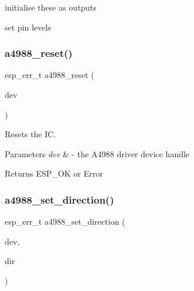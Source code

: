 initialise these as outputs

set pin levels \mbox{\label{group__A4988__Driver__functions_ga8841dcdeca8a2b9ae13f3e8e1a63884c}} 
\subsubsection{\texorpdfstring{a4988\+\_\+reset()}{a4988\_reset()}}
{\footnotesize\ttfamily esp\+\_\+err\+\_\+t a4988\+\_\+reset (\begin{DoxyParamCaption}\item[{\hyperlink{group__A4988__definitions_ga16590a9dd79ad8fcf4c317be2659b6c5}{A4988\+\_\+\+D\+EV}}]{dev }\end{DoxyParamCaption})}



Resets the IC. 


\begin{DoxyParams}{Parameters}
{\em dev} & -\/ the A4988 driver device handle \\
\hline
\end{DoxyParams}
\begin{DoxyReturn}{Returns}
E\+S\+P\+\_\+\+OK or Error 
\end{DoxyReturn}
\mbox{\label{group__A4988__Driver__functions_ga3762fb75b81dc81b9348a2c29d0de3bc}} 
\subsubsection{\texorpdfstring{a4988\+\_\+set\+\_\+direction()}{a4988\_set\_direction()}}
{\footnotesize\ttfamily esp\+\_\+err\+\_\+t a4988\+\_\+set\+\_\+direction (\begin{DoxyParamCaption}\item[{\hyperlink{group__A4988__definitions_ga16590a9dd79ad8fcf4c317be2659b6c5}{A4988\+\_\+\+D\+EV}}]{dev,  }\item[{bool $\ast$}]{dir }\end{DoxyParamCaption})}



